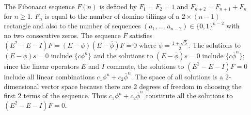 \documentclass[11pt]{article}
\begin{document}
The Fibonacci sequence $F(n)$ is defined by $F_1=F_2=1$ and $F_{n+2} = F_{n+1}+F_n$ for $n\ge 1$.
$F_n$ is equal to the number of domino tiliings of a $2\times (n-1)$ rectangle
and also to the number of sequences $(a_1,\ldots,a_{n-2})\in \{0,1\}^{n-2}$ with no two consecutive zeros.
The sequence $F$ satisfies $(E^2-E-I)F= (E-\phi)(E-\overline{\phi})F = 0$ where $\phi = \frac{1+\sqrt{5}}{2}$.
The solutions to $(E-\phi)s=0$ include $\{c\phi^n\}$ and the solutions to $(E-\overline{\phi})s=0$ include $\{c\overline{\phi}^n\}$;
since the linear operators $E$ and $I$ commute, the solutions to $(E^2-E-I)F=0$ include all linear combinations 
$c_1\phi^n+c_2\overline{\phi}^n$. The space of all solutions is a 2-dimensional vector space because there
are 2 degrees of freedom in choosing the first 2 terms of the sequence. Thus $c_1\phi^n+c_2\overline{\phi}^n$
constitute all the solutions to $(E^2-E-I)F=0$.
\end{document}
